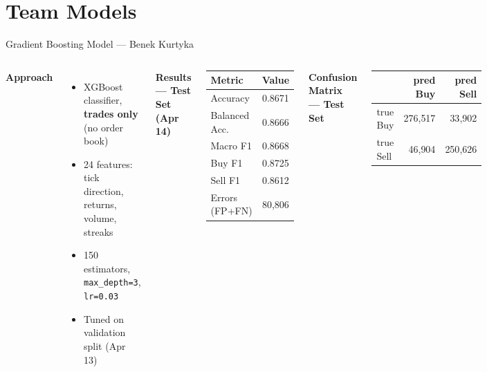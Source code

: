 \documentclass[aspectratio=169,10pt]{beamer}
\newcommand{\code}[1]{\texttt{\small #1}}
\begin{document}
\section{Team Models}

\begin{frame}{Gradient Boosting Model — Benek Kurtyka}
  \begin{columns}[T]
    \textbf{Approach}
    \begin{itemize}
      \item XGBoost classifier, \textbf{trades only} (no order book)
      \item 24 features: tick direction, returns, volume, streaks
      \item 150 estimators, \code{max\_depth=3}, \code{lr=0.03}
      \item Tuned on validation split (Apr 13)
    \end{itemize}

    \medskip
    \textbf{Results — Test Set (Apr 14)}
    \begin{center}
    \begin{tabular}{lc}
      \toprule
      Metric & Value \\
      \midrule
      Accuracy       & 0.8671 \\
      Balanced Acc.  & 0.8666 \\
      Macro F1       & 0.8668 \\
      Buy F1         & 0.8725 \\
      Sell F1        & 0.8612 \\
      Errors (FP+FN) & 80{,}806 \\
      \bottomrule
    \end{tabular}
    \end{center}

    \textbf{Confusion Matrix — Test Set}
    \begin{center}
    \begin{tabular}{lrr}
      \toprule
       & pred Buy & pred Sell \\
      \midrule
      true Buy  & 276{,}517 & 33{,}902 \\
      true Sell & 46{,}904  & 250{,}626 \\
      \bottomrule
    \end{tabular}
    \end{center}


\end{columns}
\end{frame}
\end{document}
